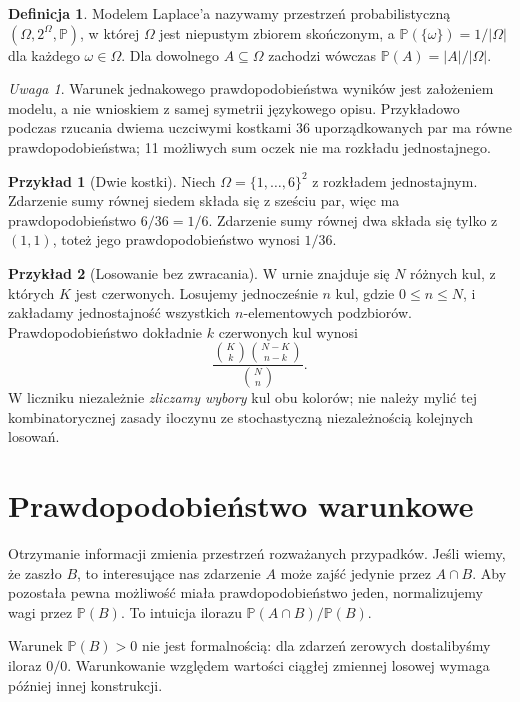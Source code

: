 \documentclass[11pt,a4paper,oneside]{report}
\numberwithin{equation}{chapter}
\theoremstyle{plain}
\theoremstyle{definition}
\newtheorem{definicja}{Definicja}[chapter]
\newtheorem{przyklad}{Przykład}[chapter]
\theoremstyle{remark}
\newtheorem{uwaga}{Uwaga}[chapter]
\newcommand{\Prob}{\mathbb{P}}
\begin{document}
\begin{definicja}
Modelem Laplace'a nazywamy przestrzeń probabilistyczną
$(\Omega,2^\Omega,\Prob)$, w której $\Omega$ jest niepustym zbiorem
skończonym, a $\Prob(\{\omega\})=1/|\Omega|$ dla każdego
$\omega\in\Omega$. Dla dowolnego $A\subseteq\Omega$ zachodzi wówczas
$\Prob(A)=|A|/|\Omega|$.
\end{definicja}

\begin{uwaga}
Warunek jednakowego prawdopodobieństwa wyników jest założeniem
modelu, a nie wnioskiem z samej symetrii językowego opisu.
Przykładowo podczas rzucania dwiema uczciwymi kostkami
36 uporządkowanych par ma równe prawdopodobieństwa; 11 możliwych sum
oczek nie ma rozkładu jednostajnego.
\end{uwaga}

\begin{przyklad}[Dwie kostki]
Niech $\Omega=\{1,\ldots,6\}^2$ z rozkładem jednostajnym.
Zdarzenie sumy równej siedem składa się z sześciu par,
więc ma prawdopodobieństwo $6/36=1/6$. Zdarzenie sumy równej dwa
składa się tylko z $(1,1)$, toteż jego prawdopodobieństwo wynosi $1/36$.
\end{przyklad}

\begin{przyklad}[Losowanie bez zwracania]
W urnie znajduje się $N$ różnych kul, z których $K$ jest czerwonych.
Losujemy jednocześnie $n$ kul, gdzie $0\leq n\leq N$, i zakładamy
jednostajność wszystkich $n$-elementowych podzbiorów.
Prawdopodobieństwo dokładnie $k$ czerwonych kul wynosi
\[
\frac{\binom Kk\binom{N-K}{n-k}}{\binom Nn}.
\]
W liczniku niezależnie \emph{zliczamy wybory} kul obu kolorów;
nie należy mylić tej kombinatorycznej zasady iloczynu
ze stochastyczną niezależnością kolejnych losowań.
\end{przyklad}

\section{Prawdopodobieństwo warunkowe}
Otrzymanie informacji zmienia przestrzeń rozważanych przypadków.
Jeśli wiemy, że zaszło $B$, to interesujące nas zdarzenie $A$
może zajść jedynie przez $A\cap B$. Aby pozostała pewna
możliwość miała prawdopodobieństwo jeden, normalizujemy
wagi przez $\Prob(B)$. To intuicja ilorazu
$\Prob(A\cap B)/\Prob(B)$.

Warunek $\Prob(B)>0$ nie jest formalnością: dla zdarzeń
zerowych dostalibyśmy iloraz $0/0$. Warunkowanie względem
wartości ciągłej zmiennej losowej wymaga później innej konstrukcji.
\end{document}

